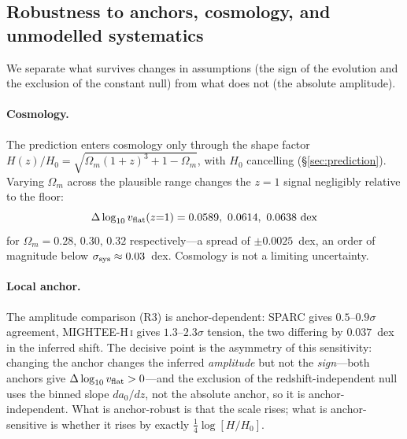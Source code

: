 \documentclass[fleqn,usenatbib]{mnras}
\newcommand{\dlogv}{\Delta\log_{10} v_{\rm flat}}
\newcommand{\ssys}{\sigma_{\rm sys}}
\begin{document}
\subsection{Robustness to anchors, cosmology, and unmodelled
systematics}\label{sec:robust}

We separate what survives changes in assumptions (the sign of the evolution and the
exclusion of the constant null) from what does not (the absolute amplitude).

\paragraph{Cosmology.} The prediction enters cosmology only through the shape factor
$H(z)/H_0=\sqrt{\Omega_m(1+z)^3+1-\Omega_m}$, with $H_0$ cancelling
(\S\ref{sec:prediction}). Varying $\Omega_m$ across the plausible range changes the
$z=1$ signal negligibly relative to the floor:
\begin{equation}
\dlogv(z{=}1)=0.0589,\ 0.0614,\ 0.0638~{\rm dex}
\end{equation}
for $\Omega_m=0.28,\,0.30,\,0.32$ respectively---a spread of $\pm0.0025$~dex,
an order of magnitude below $\ssys\approx0.03$~dex.
Cosmology is not a limiting uncertainty.

\paragraph{Local anchor.} The amplitude comparison (R3) is anchor-dependent: SPARC
gives $0.5$--$0.9\sigma$ agreement, MIGHTEE-H\,\textsc{i} gives $1.3$--$2.3\sigma$
tension, the two differing by $0.037$~dex in the inferred shift. The decisive point
is the asymmetry of this sensitivity: changing the anchor changes the inferred
\emph{amplitude} but not the \emph{sign}---both anchors give $\dlogv>0$---and the
exclusion of the redshift-independent null uses the binned slope $da_0/dz$, not the
absolute anchor, so it is anchor-independent. What is anchor-robust is that the scale
rises; what is anchor-sensitive is whether it rises by exactly $\tfrac14\log[H/H_0]$.
\end{document}
